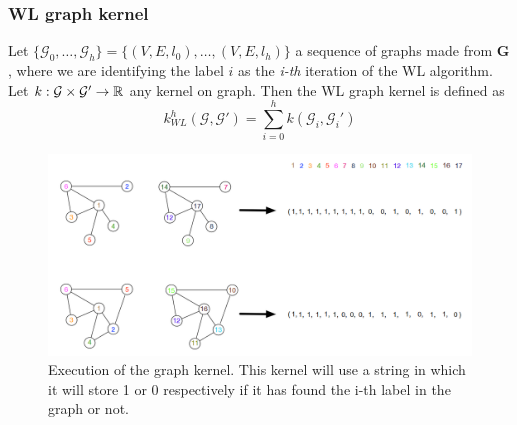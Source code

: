         \subsubsection{WL graph kernel}
            Let $\{\mathcal{G}_0, \dots, \mathcal{G}_h \} = \{ (V, E, l_0), \dots, (V, E, l_h) \}$ a sequence of graphs made from $\mathbf{G}$, where we are identifying the label $i$ as the \textit{i-th} iteration of the WL algorithm.
            Let $k : \mathcal{G} \times \mathcal{G}' \rightarrow \mathbb{R}$ any kernel on graph. Then the WL graph kernel is defined as 
            $$k_{WL} ^ h (\mathcal{G}, \mathcal{G}') = \sum _{i=0} ^ h k(\mathcal{G}_i, \mathcal{G}_i ')$$

            \begin{figure}[ht]
                \centering
                \includegraphics[scale=0.5]{images/graph_kernel.png}
                \caption{Execution of the graph kernel. This kernel will use a string in which it will store 1 or 0 respectively if it has found the i-th label in the graph or not. }
                \label{fig:ML_kernel}
            \end{figure}
            